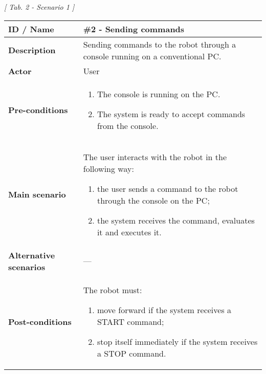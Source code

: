 \documentclass[a4paper]{article}
\begin{document}
\begin{center}
	\textit{[ Tab. 2 - Scenario 1 ]}
\end{center}

\hfill \break

\def\arraystretch{1.8}
\begin{tabular}{ | m{4cm} | m{11cm}| }
	
	\hline
	
	\textbf{ID / Name}&\textbf{\#2 - Sending commands}\\ 
	
	\hline
	
	\textbf{Description}&Sending commands to the robot through a console running on a conventional PC.\\

	\hline
	
	\textbf{Actor}&User\\
	
	\hline	

	\textbf{Pre-conditions}&
	\begin{enumerate}
		\item The console is running on the PC.
		\item The system is ready to accept commands from the console.
	\end{enumerate}\\

	\hline

	\textbf{Main scenario}&The user interacts with the robot in the following way:
	\begin{enumerate}
		\item the user sends a command to the robot through the console on the PC;
		\item the system receives the command, evaluates it and executes it.
	\end{enumerate}\\
	
	\hline	
	
	\textbf{Alternative scenarios}&---\\
	
	\hline
	
	\textbf{Post-conditions}&The robot must:
	\begin{enumerate}
		\item move forward if the system receives a START command;
		\item stop itself immediately if the system receives a STOP command.
	\end{enumerate}\\
	
	\hline
	
\end{tabular}
\end{document}
